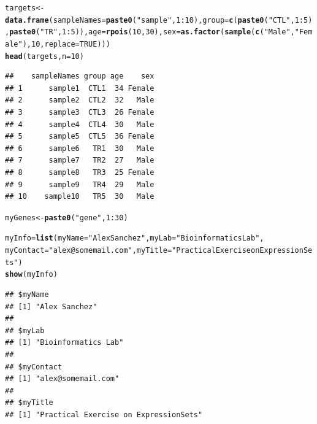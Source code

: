 \documentclass[a4paper]{article}\usepackage[]{graphicx}\usepackage[]{color}
\makeatletter
\newcommand{\hlnum}[1]{\textcolor[rgb]{0.686,0.059,0.569}{#1}}%
\newcommand{\hlstr}[1]{\textcolor[rgb]{0.192,0.494,0.8}{#1}}%
\newcommand{\hlopt}[1]{\textcolor[rgb]{0,0,0}{#1}}%
\newcommand{\hlstd}[1]{\textcolor[rgb]{0.345,0.345,0.345}{#1}}%
\newcommand{\hlkwb}[1]{\textcolor[rgb]{0.69,0.353,0.396}{#1}}%
\newcommand{\hlkwc}[1]{\textcolor[rgb]{0.333,0.667,0.333}{#1}}%
\newcommand{\hlkwd}[1]{\textcolor[rgb]{0.737,0.353,0.396}{\textbf{#1}}}%
\newenvironment{kframe}{%
 \def\at@end@of@kframe{}%
 \ifinner\ifhmode%
  \def\at@end@of@kframe{\end{minipage}}%
  \begin{minipage}{\columnwidth}%
 \fi\fi%
 \def\FrameCommand##1{\hskip\@totalleftmargin \hskip-\fboxsep
 \colorbox{shadecolor}{##1}\hskip-\fboxsep
     \hskip-\linewidth \hskip-\@totalleftmargin \hskip\columnwidth}%
 \MakeFramed {\advance\hsize-\width
   \@totalleftmargin\z@ \linewidth\hsize
   \@setminipage}}%
 {\par\unskip\endMakeFramed%
 \at@end@of@kframe}
\newenvironment{knitrout}{}{} %
\makeatother
\begin{document}
\begin{knitrout}
\color{fgcolor}\begin{kframe}
\begin{alltt}
\hlstd{targets} \hlkwb{<-} \hlkwd{data.frame}\hlstd{(}\hlkwc{sampleNames} \hlstd{=} \hlkwd{paste0}\hlstd{(}\hlstr{"sample"}\hlstd{,}\hlnum{1}\hlopt{:}\hlnum{10}\hlstd{),} \hlkwc{group}\hlstd{=}\hlkwd{c}\hlstd{(}\hlkwd{paste0}\hlstd{(}\hlstr{"CTL"}\hlstd{,}\hlnum{1}\hlopt{:}\hlnum{5}\hlstd{),}\hlkwd{paste0}\hlstd{(}\hlstr{"TR"}\hlstd{,}\hlnum{1}\hlopt{:}\hlnum{5}\hlstd{)),}\hlkwc{age} \hlstd{=} \hlkwd{rpois}\hlstd{(}\hlnum{10}\hlstd{,} \hlnum{30}\hlstd{),} \hlkwc{sex}\hlstd{=}\hlkwd{as.factor}\hlstd{(}\hlkwd{sample}\hlstd{(}\hlkwd{c}\hlstd{(}\hlstr{"Male"}\hlstd{,} \hlstr{"Female"}\hlstd{),}\hlnum{10}\hlstd{,}\hlkwc{replace}\hlstd{=}\hlnum{TRUE}\hlstd{)))}
\hlkwd{head}\hlstd{(targets,} \hlkwc{n}\hlstd{=}\hlnum{10}\hlstd{)}
\end{alltt}
\begin{verbatim}
##    sampleNames group age    sex
## 1      sample1  CTL1  34 Female
## 2      sample2  CTL2  32   Male
## 3      sample3  CTL3  26 Female
## 4      sample4  CTL4  30   Male
## 5      sample5  CTL5  36 Female
## 6      sample6   TR1  30   Male
## 7      sample7   TR2  27   Male
## 8      sample8   TR3  25 Female
## 9      sample9   TR4  29   Male
## 10    sample10   TR5  30   Male
\end{verbatim}
\end{kframe}
\end{knitrout}

\begin{knitrout}
\color{fgcolor}\begin{kframe}
\begin{alltt}
\hlstd{myGenes} \hlkwb{<-}  \hlkwd{paste0}\hlstd{(}\hlstr{"gene"}\hlstd{,}\hlnum{1}\hlopt{:}\hlnum{30}\hlstd{)}
\end{alltt}
\end{kframe}
\end{knitrout}

\begin{knitrout}
\color{fgcolor}\begin{kframe}
\begin{alltt}
\hlstd{myInfo}\hlkwb{=}\hlkwd{list}\hlstd{(}\hlkwc{myName}\hlstd{=}\hlstr{"Alex Sanchez"}\hlstd{,} \hlkwc{myLab}\hlstd{=}\hlstr{"Bioinformatics Lab"}\hlstd{,}
          \hlkwc{myContact}\hlstd{=}\hlstr{"alex@somemail.com"}\hlstd{,} \hlkwc{myTitle}\hlstd{=}\hlstr{"Practical Exercise on ExpressionSets"}\hlstd{)}
\hlkwd{show}\hlstd{(myInfo)}
\end{alltt}
\begin{verbatim}
## $myName
## [1] "Alex Sanchez"
## 
## $myLab
## [1] "Bioinformatics Lab"
## 
## $myContact
## [1] "alex@somemail.com"
## 
## $myTitle
## [1] "Practical Exercise on ExpressionSets"
\end{verbatim}
\end{kframe}
\end{knitrout}
\end{document}

